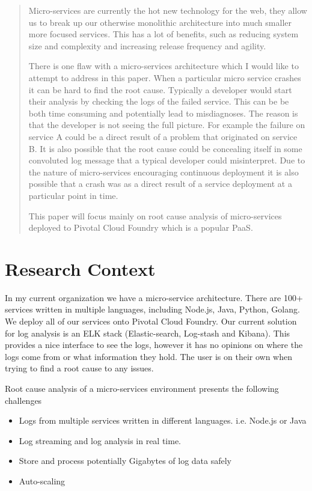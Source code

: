 \begin{abstract}
Micro-services are currently the hot new technology for the web, they allow us to break up our otherwise monolithic architecture into much smaller more focused services. This has a lot of benefits, such as reducing system size and complexity and increasing release frequency and agility. 

There is one flaw with a micro-services architecture which I would like to attempt to address in this paper. When a particular micro service crashes it can be hard to find the root cause. Typically a developer would start their analysis by checking the logs of the failed service. This can be be both time consuming and potentially lead to misdiagnoses. The reason is that the developer is not seeing the full picture. For example the failure on service A could be a direct result of a problem that originated on service B. It is also possible that the root cause could be concealing itself in some convoluted log message that a typical developer could misinterpret. Due to the nature of micro-services encouraging continuous deployment it is also possible that a crash was as a direct result of a service deployment at a particular point in time. 

This paper will focus mainly on root cause analysis of micro-services deployed to Pivotal Cloud Foundry which is a popular PaaS.

\end{abstract}

\chapter{Research Context}
In my current organization we have a micro-service architecture. There are 100+ services written in multiple languages, including Node.js, Java, Python, Golang. We deploy all of our services onto Pivotal Cloud Foundry. Our current solution for log analysis is an ELK stack (Elastic-search, Log-stash and Kibana). This provides a nice interface to see the logs, however it has no opinions on where the logs come from or what information they hold. The user is on their own when trying to find a root cause to any issues.

Root cause analysis of a micro-services environment presents the following challenges

\begin{itemize}
  \item Logs from multiple services written in different languages. i.e. Node.js or Java
  \item Log streaming and log analysis in real time. 
  \item Store and process potentially Gigabytes of log data safely
  \item Auto-scaling
\end{itemize}

